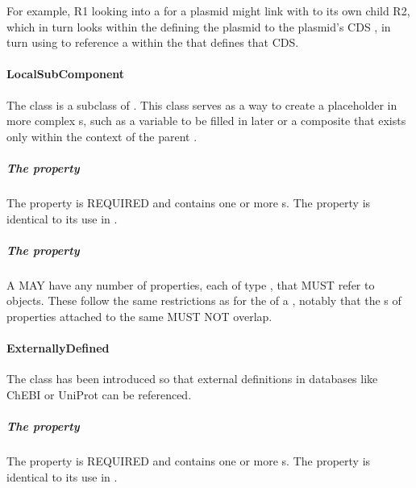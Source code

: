 For example,  R1 looking into a  for a plasmid might link with  to its own child  R2, which in turn looks within the  defining the plasmid to the plasmid's CDS , in turn using  to reference a  within the  that defines that CDS.

\paragraph{LocalSubComponent}
\label{sec:LocalSubComponent}

The  class is a subclass of . 
This class serves as a way to create a placeholder in more complex s, such as a variable to be filled in later or a composite that exists only within the context of the parent .

\subparagraph{The  property}\label{sec:type:LSC}

The  property is REQUIRED and contains one or more s. The  property is identical to its use in .

\subparagraph{The  property}\label{sec:hasLocation:LSC}

A  MAY have any number of  properties, each of type , that MUST refer to  objects. 
These follow the same restrictions as for the  of a , notably that the s of  properties attached to the same  MUST NOT overlap.

\paragraph{ExternallyDefined}
\label{sec:ExternallyDefined}

The  class has been introduced so that external definitions in databases like ChEBI or UniProt can be referenced.

\subparagraph{The  property}\label{sec:type:ED}

The  property is REQUIRED and contains one or more s. The  property is identical to its use in .

